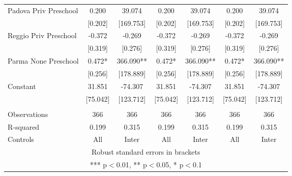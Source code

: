 \begin{tabular}{lcccccc}
Padova Priv Preschool & 0.200 & 39.074 & 0.200 & 39.074 & 0.200 & 39.074 \\
 & [0.202] & [169.753] & [0.202] & [169.753] & [0.202] & [169.753] \\
Reggio Priv Preschool & -0.372 & -0.269 & -0.372 & -0.269 & -0.372 & -0.269 \\
 & [0.319] & [0.276] & [0.319] & [0.276] & [0.319] & [0.276] \\
Parma None Preschool & 0.472* & 366.090** & 0.472* & 366.090** & 0.472* & 366.090** \\
 & [0.256] & [178.889] & [0.256] & [178.889] & [0.256] & [178.889] \\
Constant & 31.851 & -74.307 & 31.851 & -74.307 & 31.851 & -74.307 \\
 & [75.042] & [123.712] & [75.042] & [123.712] & [75.042] & [123.712] \\
 &  &  &  &  &  &  \\
Observations & 366 & 366 & 366 & 366 & 366 & 366 \\
R-squared & 0.199 & 0.315 & 0.199 & 0.315 & 0.199 & 0.315 \\
 Controls & All & Inter & All & Inter & All & Inter \\ \hline
\multicolumn{7}{c}{ Robust standard errors in brackets} \\
\multicolumn{7}{c}{ *** p$<$0.01, ** p$<$0.05, * p$<$0.1} \\
\end{tabular}
